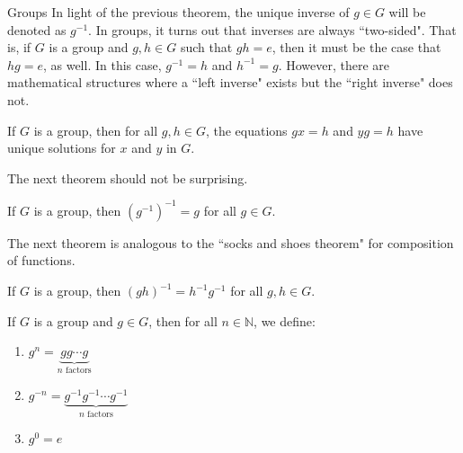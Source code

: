 \begin{section}{Groups}
In light of the previous theorem, the unique inverse of $g\in G$ will be denoted as $g^{-1}$. In groups, it turns out that inverses are always ``two-sided". That is, if $G$ is a group and $g,h\in G$ such that $gh=e$, then it must be the case that $hg=e$, as well. In this case, $g^{-1}=h$ and $h^{-1}=g$. However, there are mathematical structures where a ``left inverse" exists but the ``right inverse" does not. 

\begin{theorem}\label{thm:unique_soln}
If $G$ is a group, then for all $g,h\in G$, the equations $gx=h$ and $yg=h$ have unique solutions for $x$ and $y$ in $G$.  
\end{theorem}

%
%

The next theorem should not be surprising.

\begin{theorem}
If $G$ is a group, then $(g^{-1})^{-1}=g$ for all $g\in G$.
\end{theorem}

The next theorem is analogous to the ``socks and shoes theorem" for composition of functions.

\begin{theorem}
If $G$ is a group, then $(gh)^{-1}=h^{-1}g^{-1}$ for all $g,h\in G$.
\end{theorem}

\begin{definition}\label{def:exponents}
If $G$ is a group and $g\in G$, then for all $n\in \mathbb{N}$, we define:
\begin{enumerate}[label=\textrm{(\alph*)}]
\item $g^n=\underbrace{gg\cdots g}_{n\text{ factors}}$
\item $g^{-n}=\underbrace{g^{-1}g^{-1}\cdots g^{-1}}_{n\text{ factors}}$
\item $g^0=e$
\end{enumerate}
\end{definition}


\end{section}
